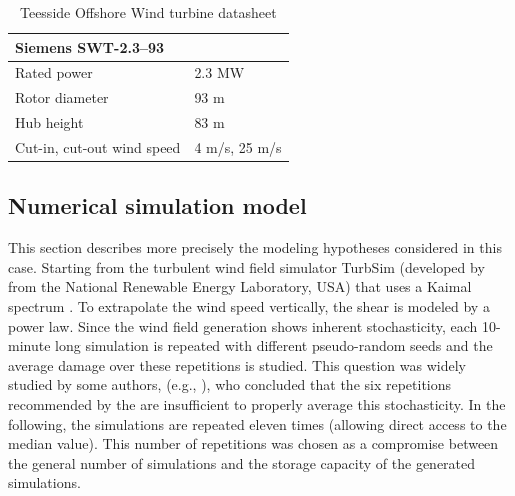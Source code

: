 \begin{table}[h]
    \centering
    \caption{Teesside Offshore Wind turbine datasheet}
    \begin{tabular}{ll}
     \hline
     \multicolumn{2}{l}{Siemens SWT-2.3–93} \\ \hline
        Rated power & 2.3 MW\\
        Rotor diameter & 93 m\\
        Hub height & 83 m\\
        Cut-in, cut-out wind speed & 4 m/s, 25 m/s\\\hline
    \end{tabular}
    \label{tab:owt_datasheet}
\end{table}


\subsection{Numerical simulation model}
This section describes more precisely the modeling hypotheses considered in this case. 
Starting from the turbulent wind field simulator TurbSim (developed by \cite{turbsim_2009} from the National Renewable Energy Laboratory, USA) that uses a Kaimal spectrum \citep{kaimal_1972}. 
To extrapolate the wind speed vertically, the shear is modeled by a power law. 
Since the wind field generation shows inherent stochasticity, each 10-minute long simulation is repeated with different pseudo-random seeds and the average damage over these repetitions is studied. 
This question was widely studied by some authors, (e.g., \cite{slot_sorensen_2020}), who concluded that the six repetitions recommended by the \cite{iec_2019} are insufficient to properly average this stochasticity. 
In the following, the simulations are repeated eleven times (allowing direct access to the median value). 
This number of repetitions was chosen as a compromise between the general number of simulations and the storage capacity of the generated simulations.

